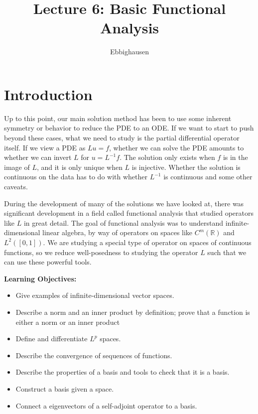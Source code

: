 \documentclass{article}
\title{Lecture 6: Basic Functional Analysis}
\author{Ebbighausen}
\newcommand{\R}{{\mathbb{R}}}
\begin{document}
	\pagestyle{fancy}
	\fancyfoot{} 
	
	\maketitle
	
	\section{Introduction}
	
	
	Up to this point, our main solution method has been to use some inherent symmetry or behavior to reduce the PDE to an ODE. If we want to start to push beyond these cases, what we need to study is the partial differential operator itself. If we view a PDE as $Lu = f$, whether we can solve the PDE amounts to whether we can invert $L$ for $u = L^{-1}f$. The solution only exists when $f$ is in the image of $L$, and it is only unique when $L$ is injective. Whether the solution is continuous on the data has to do with whether $L^{-1}$ is continuous and some other caveats. 
	
	
	During the development of many of the solutions we have looked at, there was significant development in a field called functional analysis that studied operators like $L$ in great detail. The goal of functional analysis was to understand infinite-dimensional linear algebra, by way of operators on spaces like $C^{m}(\R)$ and $L^{2}([0,1])$. We are studying a special type of operator on spaces of continuous functions, so we reduce well-posedness to studying the operator $L$ such that we can use these powerful tools. 
	
	
	\vspace{0.25 cm}
	
	\textbf{Learning Objectives:}
	
	\begin{itemize}
		\item Give examples of infinite-dimensional vector spaces. 
		\item Describe a norm and an inner product by definition; prove that a function is either a norm or an inner product
		\item Define and differentiate $L^p$ spaces. 
		\item Describe the convergence of sequences of functions.
		\item Describe the properties of a basis and tools to check that it is a basis.
		\item Construct a basis given a space.
		\item Connect a eigenvectors of a self-adjoint operator to a basis. 
	\end{itemize}
	
\end{document}
